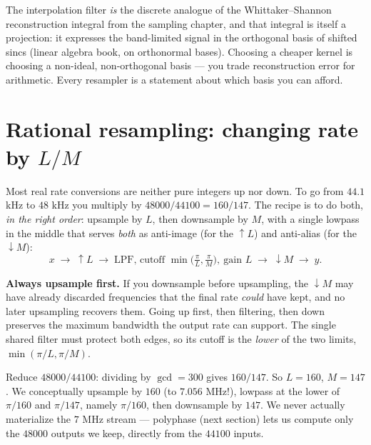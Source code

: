 \begin{connectionbox}
The interpolation filter \emph{is} the discrete analogue of the
Whittaker--Shannon reconstruction integral from the sampling chapter, and that
integral is itself a projection: it expresses the band-limited signal in the
orthogonal basis of shifted sincs (linear algebra book, on orthonormal bases).
Choosing a cheaper kernel is choosing a non-ideal, non-orthogonal basis --- you
trade reconstruction error for arithmetic. Every resampler is a statement about
which basis you can afford.
\end{connectionbox}

\section{Rational resampling: changing rate by $L/M$}
\label{ch22:rational}

Most real rate conversions are neither pure integers up nor down. To go from
$44.1$ kHz to $48$ kHz you multiply by $48000/44100 = 160/147$. The recipe is to
do both, \emph{in the right order}: upsample by $L$, then downsample by $M$, with
a single lowpass in the middle that serves \emph{both} as anti-image (for the
$\uparrow L$) and anti-alias (for the $\downarrow M$):
\begin{equation}
  x \;\to\; \boxed{\uparrow L} \;\to\;
  \boxed{\text{LPF, cutoff } \min\!\big(\tfrac{\pi}{L},\tfrac{\pi}{M}\big),\
  \text{gain } L} \;\to\; \boxed{\downarrow M} \;\to\; y.
  \label{ch22:ratchain}
\end{equation}

\begin{focusbox}
\textbf{Always upsample first.} If you downsample before upsampling, the
$\downarrow M$ may have already discarded frequencies that the final rate
\emph{could} have kept, and no later upsampling recovers them. Going up first,
then filtering, then down preserves the maximum bandwidth the output rate can
support. The single shared filter must protect both edges, so its cutoff is the
\emph{lower} of the two limits, $\min(\pi/L, \pi/M)$.
\end{focusbox}

\begin{example}
\label{ch22:ex-audio}
Reduce $48000/44100$: dividing by $\gcd = 300$ gives $160/147$. So $L=160$,
$M=147$. We conceptually upsample by $160$ (to $7.056$ MHz!), lowpass at the
lower of $\pi/160$ and $\pi/147$, namely $\pi/160$, then downsample by $147$. We
never actually materialize the $7$ MHz stream --- polyphase (next section) lets
us compute only the $48000$ outputs we keep, directly from the $44100$ inputs.
\end{example}

